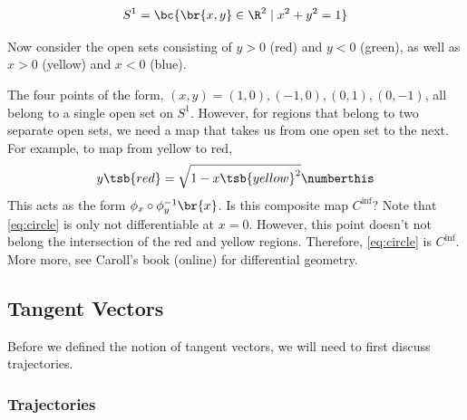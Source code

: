 \documentclass{article}
\begin{document}
\[ S^1 = \bc{\br{x,y}\in \R^2 \mid x^2 + y^2 = 1} \]

Now consider the open sets consisting of $y>0$ (red) and $y<0$ (green), as well as $x>0$ (yellow) and $x<0$ (blue).

\begin{center}
\end{center}

The four points of the form, $(x,y) = (1,0),(-1,0),(0,1),(0,-1)$, all belong to a single open set on $S^1$. However, for regions that belong to two separate open sets, we need a map that takes us from one open set to the next. For example, to map from yellow to red,
\[ y\tsb{red} = \sqrt{1 - x\tsb{yellow}^2} \numberthis \label{eq:circle}\]
This acts as the form $\phi_x \circ \phi_y^{-1} \br{x}$. Is this composite map $C^{\inf}$? Note that \eqref{eq:circle} is only not differentiable at $x = 0$. However, this point doesn't not belong the intersection of the red and yellow regions. Therefore, \eqref{eq:circle} is $C^\inf$. More more, see Caroll's book (online) for differential geometry.

\subsection{Tangent Vectors}

Before we defined the notion of tangent vectors, we will need to first discuss trajectories.

\subsubsection{Trajectories}

\newcommand{\CC}{\mathcal{C}}
\end{document}
